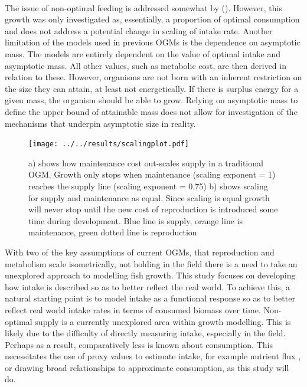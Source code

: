 \documentclass[a4paper, 11pt, hidelinks]{article} %
\begin{document}
	\\
	The issue of non-optimal feeding is addressed somewhat by \citeauthor{Hou2011} (\citeyear{Hou2011}).  However, this growth was only investigated as, essentially, a proportion of optimal consumption and does not address a potential change in scaling of intake rate.
	Another limitation of the models used in previous OGMs is the dependence on asymptotic mass.  The models are entirely dependent on the value of optimal intake and asymptotic mass.  All other values, such as metabolic cost, are then derived in relation to these.  However, organisms are not born with an inherent restriction on the size they can attain, at least not energetically.  If there is surplus energy for a given mass, the organism should be able to grow.  Relying on asymptotic mass to define the upper bound of attainable mass does not allow for investigation of the mechanisms that underpin asymptotic size in reality. 
	\begin{figure}[h]
		\centering
		\texttt{[image: ../../results/scalingplot.pdf]}
		\caption{a) shows how maintenance cost out-scales supply in a traditional OGM.  Growth only stops when maintenance (scaling exponent = 1) reaches the supply line (scaling exponent = 0.75)  b) shows scaling for supply and maintenance as equal. Since scaling is equal growth will never stop until the new cost of reproduction is introduced some time during development.  Blue line is supply, orange line is maintenance, green dotted line is reproduction}
		\label{scaling_plot}
	\end{figure}
	With two of the key assumptions of current OGMs, that reproduction and metabolism scale isometrically, not holding in the field \parencite{Barneche2018, Pawar2012, Peters1983} there is a need to take an unexplored approach to modelling fish growth.  This study focuses on developing how intake is described so as to better reflect the real world.  To achieve this, a natural starting point is to model intake as a functional response \parencite{Holling1959} so as to better reflect real world intake rates in terms of consumed biomass over time.  Non-optimal supply is a currently unexplored area within growth modelling.  This is likely due to the difficulty of directly measuring intake, especially in the field. Perhaps as a result, comparatively less is known about consumption.  This necessitates the use of proxy values to estimate intake, for example nutrient flux \parencite{Schiettekatte2020}, or drawing broad relationships to approximate consumption, as this study will do.
\end{document}
